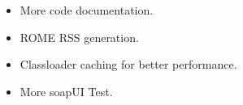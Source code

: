 \begin{itemize}
    \item More code documentation.
    \item ROME RSS generation.
    \item Classloader caching for better performance.
    \item More soapUI Test.
\end{itemize}
